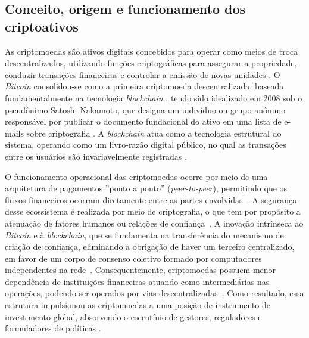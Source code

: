 \subsection{Conceito, origem e funcionamento dos criptoativos}
\label{subsec_conceito_origem_e_funcionamento_dos_criptoativos}

As criptomoedas são ativos digitais concebidos para operar como meios de troca descentralizados, utilizando funções criptográficas para assegurar a propriedade, conduzir transações financeiras e controlar a emissão de novas unidades \cite{doran2014forensic,ballis2020herding,chevallier2021forecast}. O \textit{Bitcoin} consolidou-se como a primeira criptomoeda descentralizada, baseada fundamentalmente na tecnologia \textit{blockchain} \cite{fakhfekh2020volatility}, tendo sido idealizado em 2008 sob o pseudônimo Satoshi Nakamoto, que designa um indivíduo ou grupo anônimo responsável por publicar o documento fundacional do ativo em uma lista de e-mails sobre criptografia \cite{charfeddine2020investigating}. A \textit{blockchain} atua como a tecnologia estrutural do sistema, operando como um livro-razão digital público, no qual as transações entre os usuários são invariavelmente registradas \cite{sebastiao2021forecasting}.

O funcionamento operacional das criptomoedas ocorre por meio de uma arquitetura de pagamentos ''ponto a ponto'' (\textit{peer-to-peer}), permitindo que os fluxos financeiros ocorram diretamente entre as partes envolvidas~\cite{wang2020stablecoins}. A segurança desse ecossistema é realizada por meio de criptografia, o que tem por propósito a atenuação de fatores humanos ou relações de confiança~\cite{narayanan2016bitcoin}. A inovação intrínseca ao \textit{Bitcoin} e à \textit{blockchain}, que se fundamenta na transferência do mecanismo de criação de confiança, eliminando a obrigação de haver um terceiro centralizado, em favor de um corpo de consenso coletivo formado por computadores independentes na rede~\cite{charfeddine2020investigating}. Consequentemente, criptomoedas possuem menor dependência de instituições financeiras atuando como intermediárias nas operações, podendo ser operados por vias descentralizadas~\cite{harwick2016cryptocurrency,wang2020stablecoins}. Como resultado, essa estrutura impulsionou as criptomoedas a uma posição de instrumento de investimento global, absorvendo o escrutínio de gestores, reguladores e formuladores de políticas \cite{ahmed2020risk}.

